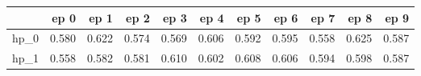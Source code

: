 \begin{tabular}{lrrrrrrrrrr}
\toprule
{} &   ep 0 &   ep 1 &   ep 2 &   ep 3 &   ep 4 &   ep 5 &   ep 6 &   ep 7 &   ep 8 &   ep 9 \\
\midrule
hp\_0 &  0.580 &  0.622 &  0.574 &  0.569 &  0.606 &  0.592 &  0.595 &  0.558 &  0.625 &  0.587 \\
hp\_1 &  0.558 &  0.582 &  0.581 &  0.610 &  0.602 &  0.608 &  0.606 &  0.594 &  0.598 &  0.587 \\
\bottomrule
\end{tabular}
